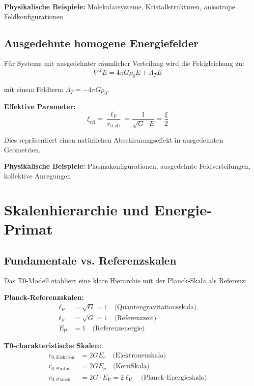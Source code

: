 \documentclass[12pt,a4paper]{report}
\newcommand{\EP}{E_{\text{P}}}            %
\newcommand{\lP}{\ell_{\text{P}}}         %
\newcommand{\tP}{t_{\text{P}}}            %
\newcommand{\Lambdat}{\Lambda_T}          %
\begin{document}
	\textbf{Physikalische Beispiele:} Molekularsysteme, Kristallstrukturen, anisotrope Feldkonfigurationen
	
	\subsection{Ausgedehnte homogene Energiefelder}\label{subsec:extended_homogeneous}
	
	Für Systeme mit ausgedehnter räumlicher Verteilung wird die Feldgleichung zu:
	\begin{equation}
		\nabla^2 E = 4\pi G \rho_0 E + \Lambdat E
		\label{eq:field_equation_extended}
	\end{equation}
	
	mit einem Feldterm $\Lambdat = -4\pi G \rho_0$.
	
	\textbf{Effektive Parameter:}
	\begin{equation}
		\xi_{\text{eff}} = \frac{\lP}{r_{0,\text{eff}}} = \frac{1}{\sqrt{G} \cdot E} = \frac{\xi}{2}
		\label{eq:xi_effective}
	\end{equation}
	
	Dies repräsentiert einen natürlichen Abschirmungseffekt in ausgedehnten Geometrien.
	
	\textbf{Physikalische Beispiele:} Plasmakonfigurationen, ausgedehnte Feldverteilungen, kollektive Anregungen
	
	\section{Skalenhierarchie und Energie-Primat}\label{sec:scale_hierarchy}
	
	\subsection{Fundamentale vs. Referenzskalen}\label{subsec:fundamental_vs_reference}
	
	Das T0-Modell etabliert eine klare Hierarchie mit der Planck-Skala als Referenz:
	
	\textbf{Planck-Referenzskalen:}
	\begin{align}
		\lP &= \sqrt{G} = 1 \quad \text{(Quantengravitationsskala)} \\
		\tP &= \sqrt{G} = 1 \quad \text{(Referenzzeit)} \\
		\EP &= 1 \quad \text{(Referenzenergie)}
	\end{align}
	
	\textbf{T0-charakteristische Skalen:}
	\begin{align}
		r_{0,\text{Elektron}} &= 2GE_e \quad \text{(Elektronenskala)} \\
		r_{0,\text{Proton}} &= 2GE_p \quad \text{(KernSkala)} \\
		r_{0,\text{Planck}} &= 2G \cdot \EP = 2\lP \quad \text{(Planck-Energieskala)}
	\end{align}
	
\end{document}
